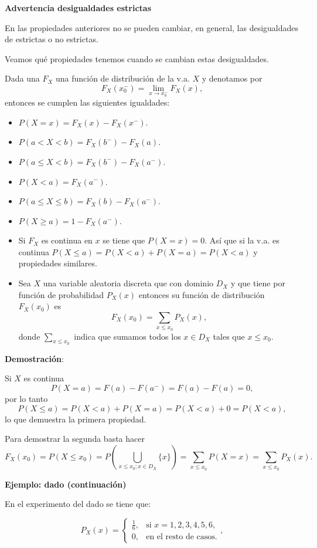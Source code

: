 \documentclass[
  letterpaper,
  DIV=11,
  numbers=noendperiod]{scrreprt}
\providecommand{\tightlist}{%
  \setlength{\itemsep}{0pt}\setlength{\parskip}{0pt}}\usepackage{longtable,booktabs,array}
\begin{document}
\textbf{Advertencia desigualdades estrictas}

En las propiedades anteriores no se pueden cambiar, en general, las
desigualdades de estrictas o no estrictas.

Veamos qué propiedades tenemos cuando se cambian estas desigualdades.

Dada una \(F_{X}\) una función de distribución de la v.a. \(X\) y
denotamos por
\[F_{X}(x_0^{-})=\displaystyle \lim_{x\to x_0^{-}} F_{X}(x),\] entonces
se cumplen las siguientes igualdades:

\begin{itemize}
\tightlist
\item
  \(P(X=x)=F_{X}(x)-F_{X}(x^{-})\).
\item
  \(P(a< X< b)=F_{X}(b^{-})-F_{X}(a)\).
\item
  \(P(a\leq X< b)=F_{X}(b^{-})-F_{X}(a^{-})\).
\item
  \(P(X<a)=F_{X}(a^{-})\).
\item
  \(P(a\leq X\leq b)=F_{X}(b)-F_{X}(a^{-})\).
\item
  \(P(X\geq a)=1-F_{X}(a^{-})\).
\item
  Si \(F_X\) es continua en \(x\) se tiene que \(P(X=x)=0\). Así que si
  la v.a. es continua \(P(X\leq a)=P(X< a)+P(X=a)=P(X<a)\) y propiedades
  similares.
\item
  Sea \(X\) una variable aleatoria discreta que con dominio \(D_X\) y
  que tiene por función de probabilidad \(P_{X}(x)\) entonces su función
  de distribución \(F_{X}(x_0)\) es
  \[F_{X}(x_0)=\sum_{x\leq x_0} P_{X}(x),\] donde
  \(\sum\limits_{x\leq x_0}\) indica que sumamos todos los \(x \in D_X\)
  tales que \(x\leq x_0\).
\end{itemize}

\textbf{Demostración}:

Si \(X\) es continua \[P(X=a)=F(a)-F(a^{-})=F(a)-F(a)=0,\] por lo tanto
\[P(X\leq a)=P(X<a)+P(X=a)= P(X<a)+0= P(X<a),\] lo que demuestra la
primera propiedad.

Para demostrar la segunda basta hacer \[ 
F_{X}(x_0)= P(X\leq x_0)=P\left(\bigcup_{x\leq
x_0; x\in D_X} \{x\}\right)= \sum_{x\leq x_0}P(X=x)= \sum_{x\leq x_0}P_{X}(x).
\]

\textbf{Ejemplo: dado (continuación)}

En el experimento del dado se tiene que:

\[P_{X}(x)=\left\{\begin{array}{ll} \frac16, & \mbox{si } x=1,2,3,4,5,6,\\ 0, & \mbox{en el resto de casos.}\end{array}\right.,\]
\end{document}
